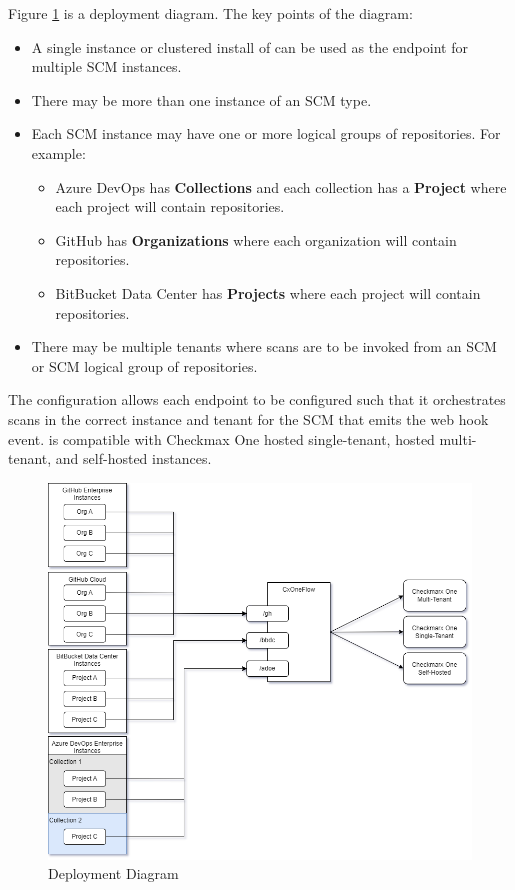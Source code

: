 Figure \ref{fig:cxoneflow-deployment} is a \cxoneflow deployment diagram. The key points of the diagram:

\begin{itemize}
    \item A single instance or clustered install of \cxoneflow can be used as the endpoint for multiple
    SCM instances.
    \item There may be more than one instance of an SCM type.
    \item Each SCM instance may have one or more logical groups of repositories.  For example:
    \begin{itemize}
        \item Azure DevOps has \textbf{Collections} and each collection has a \textbf{Project} where
        each project will contain repositories.
        \item GitHub has \textbf{Organizations} where each organization will contain repositories.
        \item BitBucket Data Center has \textbf{Projects} where each project will contain repositories.
    \end{itemize}
    \item There may be multiple \cxone tenants where scans are to be invoked from an SCM or SCM
    logical group of repositories.
\end{itemize}

The \cxoneflow configuration allows each endpoint to be configured such that it orchestrates
scans in the correct \cxone instance and tenant for the SCM that emits the web hook event.
\cxoneflow is compatible with Checkmax One hosted single-tenant, hosted multi-tenant, and self-hosted
instances.

\begin{figure}[ht]
    \includegraphics[width=\textwidth]{graphics/cxoneflow-deployment.png}
    \caption{\cxoneflow Deployment Diagram}
    \label{fig:cxoneflow-deployment}
\end{figure}

